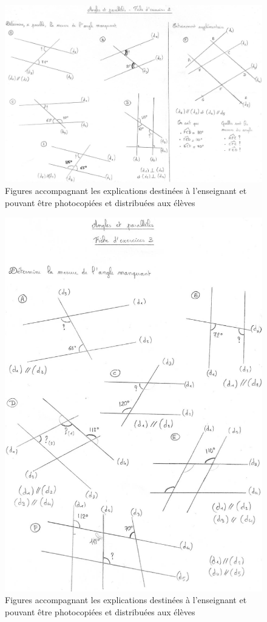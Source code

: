 \begin{figure}[h!]
    \centering
    \includegraphics[width=0.8\linewidth]{img/anglesfiche2.jpg}
    \caption{Figures accompagnant les explications destinées à l'enseignant et pouvant être photocopiées et distribuées aux élèves}
    \label{fig:angles-fiche2}
\end{figure}

\begin{figure}[h!]
    \centering
    \includegraphics[width=0.6\linewidth]{img/anglesfiche3.jpg}
    \caption{Figures accompagnant les explications destinées à l'enseignant et pouvant être photocopiées et distribuées aux élèves}
    \label{fig:angles-fiche3}
\end{figure}

\clearpage

